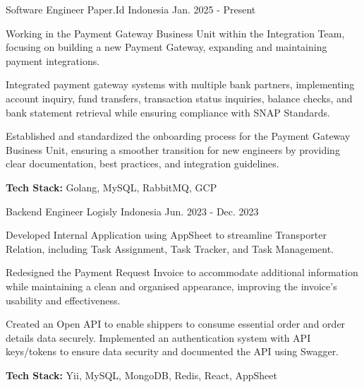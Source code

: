 

\begin{cventries}

  \cventry
    {Software Engineer} %
    {Paper.Id} %
    {Indonesia} %
    {Jan. 2025 - Present} %
    {
      \begin{cvitems} %
        \item {Working in the Payment Gateway Business Unit within the Integration Team, focusing on building a new Payment Gateway, expanding and maintaining payment integrations.}
        \item {Integrated payment gateway systems with multiple bank partners, implementing account inquiry, fund transfers, transaction status inquiries, balance checks, and bank statement retrieval while ensuring compliance with SNAP Standards.}
        \item {Established and standardized the onboarding process for the Payment Gateway Business Unit, ensuring a smoother transition for new engineers by providing clear documentation, best practices, and integration guidelines.}
        \item {\textbf{Tech Stack:} Golang, MySQL, RabbitMQ, GCP}
      \end{cvitems}
    }

  \cventry
    {Backend Engineer} %
    {Logisly} %
    {Indonesia} %
    {Jun. 2023 - Dec. 2023} %
    {
      \begin{cvitems} %
        \item {Developed Internal Application using AppSheet to streamline Transporter Relation, including Task Assignment, Task Tracker, and Task Management.}
        \item {Redesigned the Payment Request Invoice to accommodate additional information while maintaining a clean and organised appearance, improving the invoice's usability and effectiveness.}
        \item {Created an Open API to enable shippers to consume essential order and order details data securely. Implemented an authentication system with API keys/tokens to ensure data security and documented the API using Swagger.}
        \item {\textbf{Tech Stack:} Yii, MySQL, MongoDB, Redis, React, AppSheet}
      \end{cvitems}
    }


\end{cventries}
